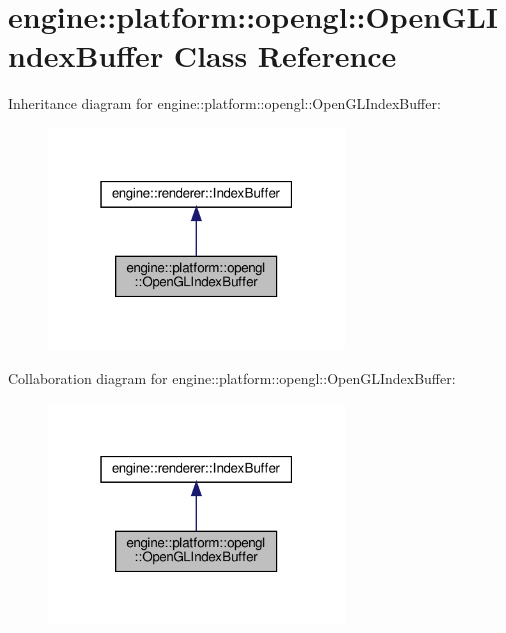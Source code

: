 \hypertarget{classengine_1_1platform_1_1opengl_1_1OpenGLIndexBuffer}{}\section{engine\+:\+:platform\+:\+:opengl\+:\+:Open\+G\+L\+Index\+Buffer Class Reference}
\label{classengine_1_1platform_1_1opengl_1_1OpenGLIndexBuffer}


Inheritance diagram for engine\+:\+:platform\+:\+:opengl\+:\+:Open\+G\+L\+Index\+Buffer\+:\nopagebreak
\begin{figure}[H]
\begin{center}
\leavevmode
\includegraphics[width=223pt]{classengine_1_1platform_1_1opengl_1_1OpenGLIndexBuffer__inherit__graph}
\end{center}
\end{figure}


Collaboration diagram for engine\+:\+:platform\+:\+:opengl\+:\+:Open\+G\+L\+Index\+Buffer\+:\nopagebreak
\begin{figure}[H]
\begin{center}
\leavevmode
\includegraphics[width=223pt]{classengine_1_1platform_1_1opengl_1_1OpenGLIndexBuffer__coll__graph}
\end{center}
\end{figure}
